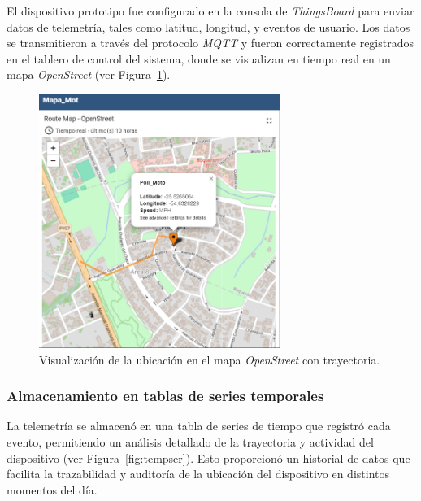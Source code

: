 El dispositivo prototipo fue configurado en la consola de \textit{ThingsBoard} para enviar datos de telemetría, tales como latitud, longitud, y eventos de usuario. Los datos se transmitieron a través del protocolo \textit{MQTT} y fueron correctamente registrados en el tablero de control del sistema, donde se visualizan en tiempo real en un mapa \textit{OpenStreet} (ver Figura~\ref{fig:mapopen}).
\begin{figure}[H]
\leavevmode
\begin{center}
\includegraphics[width=0.7\textwidth]{./capitulo_05/imagen/resmon/mapa2.png}
\caption{Visualización de la ubicación en el mapa \textit{OpenStreet} con trayectoria.\label{fig:mapopen}}
\end{center}
\end{figure}
\subsubsection{Almacenamiento en tablas de series temporales}

La telemetría se almacenó en una tabla de series de tiempo que registró cada evento, permitiendo un análisis detallado de la trayectoria y actividad del dispositivo (ver Figura~\ref{fig:tempser}). Esto proporcionó un historial de datos que facilita la trazabilidad y auditoría de la ubicación del dispositivo en distintos momentos del día.


